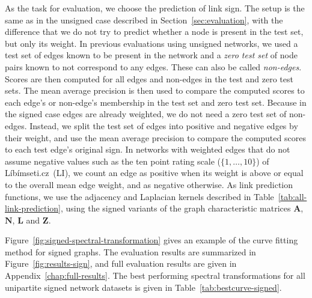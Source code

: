 \documentclass[11pt,a4paper]{book}
\begin{document}
As the task for evaluation, we choose the prediction of link sign.  
The setup is the same as in the unsigned case described in
Section~\ref{sec:evaluation}, with the difference
that we do not try to
predict whether a node is present in the test set, but only its
weight.  
In previous evaluations using unsigned networks, we used a test set of
edges known to be present in the network and a \emph{zero test set} of
node pairs known to not correspond to any edges.
These can also be called \emph{non-edges}. 
Scores are then computed for all edges and non-edges in the test and
zero test sets.  The mean average precision is then used to compare the
computed scores to each edge's or non-edge's membership in the test set
and zero test set. 
Because in the signed case edges are already weighted, we do not need a zero test
set of non-edges.
Instead, we split the test set of edges into positive and negative edges
by their weight, and use the mean average precision to compare the
computed scores to each test edge's original sign. 
In networks with weighted edges that do not assume negative values such
as the ten point rating scale ($\{1, \ldots, 10\}$) of
Líbímseti.cz~(\textsf{LI}), we count an edge as positive when its weight is
above or equal to the overall mean edge weight, and as negative
otherwise. 
As link prediction functions, we use the adjacency and Laplacian kernels
described in Table~\ref{tab:all-link-prediction}, using the signed
variants of the graph characteristic matrices $\mathbf A$, $\mathbf N$,
$\mathbf L$ and $\mathbf Z$. 

Figure~\ref{fig:signed-spectral-transformation} gives an example of
the curve fitting method for signed graphs. 
The evaluation results are summarized in
Figure~\ref{fig:results-sign}, and full evaluation results are given in
Appendix~\ref{chap:full-results}.  
The best performing spectral
transformations for all unipartite signed network datasets is given in
Table~\ref{tab:bestcurve-signed}. 
\end{document}
